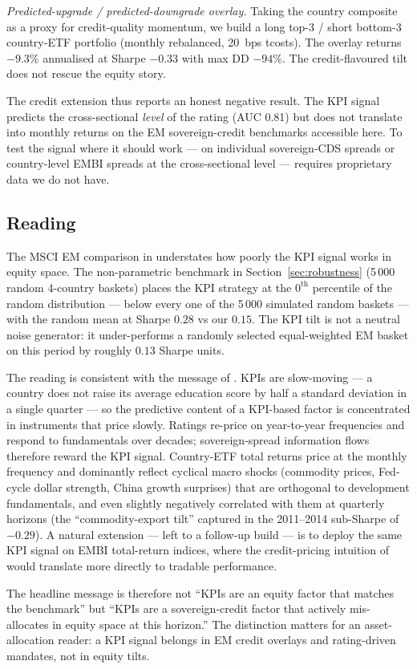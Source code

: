 \emph{Predicted-upgrade / predicted-downgrade overlay.} Taking the country composite as a proxy for credit-quality momentum, we build a long top-3 / short bottom-3 country-ETF portfolio (monthly rebalanced, 20~bps tcosts). The overlay returns $-9.3$\% annualised at Sharpe $-0.33$ with max DD $-94$\%. The credit-flavoured tilt does not rescue the equity story.

The credit extension thus reports an honest negative result. The KPI signal predicts the cross-sectional \emph{level} of the rating (AUC 0.81) but does not translate into monthly returns on the EM sovereign-credit benchmarks accessible here. To test the signal where it should work --- on individual sovereign-CDS spreads or country-level EMBI spreads at the cross-sectional level --- requires proprietary data we do not have.

\subsection{Reading}

The MSCI EM comparison in  understates how poorly the KPI signal works in equity space. The non-parametric benchmark in Section~\ref{sec:robustness} (5\,000 random 4-country baskets) places the KPI strategy at the $0^{\text{th}}$ percentile of the random distribution --- below every one of the 5\,000 simulated random baskets --- with the random mean at Sharpe $0.28$ vs our $0.15$. The KPI tilt is not a neutral noise generator: it under-performs a randomly selected equal-weighted EM basket on this period by roughly $0.13$ Sharpe units.

The reading is consistent with the message of . KPIs are slow-moving --- a country does not raise its average education score by half a standard deviation in a single quarter --- so the predictive content of a KPI-based factor is concentrated in instruments that price slowly. Ratings re-price on year-to-year frequencies and respond to fundamentals over decades; sovereign-spread information flows therefore reward the KPI signal. Country-ETF total returns price at the monthly frequency and dominantly reflect cyclical macro shocks (commodity prices, Fed-cycle dollar strength, China growth surprises) that are orthogonal to development fundamentals, and even slightly negatively correlated with them at quarterly horizons (the ``commodity-export tilt'' captured in the 2011--2014 sub-Sharpe of $-0.29$). A natural extension --- left to a follow-up build --- is to deploy the same KPI signal on EMBI total-return indices, where the credit-pricing intuition of  would translate more directly to tradable performance.

The headline message is therefore not ``KPIs are an equity factor that matches the benchmark'' but ``KPIs are a sovereign-credit factor that actively mis-allocates in equity space at this horizon.'' The distinction matters for an asset-allocation reader: a KPI signal belongs in EM credit overlays and rating-driven mandates, not in equity tilts.
